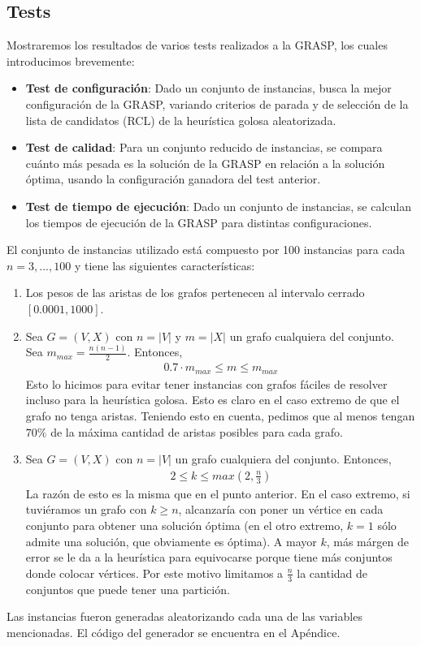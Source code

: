 \subsection{Tests}
Mostraremos los resultados de varios tests realizados a la GRASP, los cuales introducimos brevemente:
\begin{itemize}
    \item \textbf{Test de configuración}: Dado un conjunto de instancias, busca la mejor configuración de la GRASP, variando criterios de parada y de selección de la lista de candidatos (RCL) de la heurística golosa aleatorizada.
    \item \textbf{Test de calidad}: Para un conjunto reducido de instancias, se compara cuánto más pesada es la solución de la GRASP en relación a la solución óptima, usando la configuración ganadora del test anterior.
    \item \textbf{Test de tiempo de ejecución}: Dado un conjunto de instancias, se calculan los tiempos de ejecución de la GRASP para distintas configuraciones.
\end{itemize}

El conjunto de instancias utilizado está compuesto por 100 instancias para cada \\ ${n = 3, ..., 100}$ y tiene las siguientes características:
\begin{enumerate}
    \item Los pesos de las aristas de los grafos pertenecen al intervalo cerrado $[\num{0.0001}, \num{1000}]$.
    \item Sea $G = (V,X)$ con $n = |V|$ y $m = |X|$ un grafo cualquiera del conjunto.\\ Sea $m_{max} = \frac{n(n-1)}{2}$. Entonces,
            \begin{align*}
                \num{0.7} \cdot m_{max} \leq m \leq m_{max} 
            \end{align*}
            Esto lo hicimos para evitar tener instancias con grafos fáciles de resolver incluso para la heurística golosa. Esto es claro en el caso extremo de que el grafo no tenga aristas. Teniendo esto en cuenta, pedimos que al menos tengan $70\%$ de la máxima cantidad de aristas posibles para cada grafo.
    \item Sea $G = (V,X)$ con $n = |V|$ un grafo cualquiera del conjunto. Entonces,
            \begin{align*}
                        2 \leq k \leq max\left(2, \frac{n}{3}\right)
            \end{align*}
            La razón de esto es la misma que en el punto anterior. En el caso extremo, si tuviéramos un grafo con $k \geq n$, alcanzaría con poner un vértice en cada conjunto para obtener una solución óptima (en el otro extremo, $k = 1$ sólo admite una solución, que obviamente es óptima). A mayor $k$, más márgen de error se le da a la heurística para equivocarse porque tiene más conjuntos donde colocar vértices. Por este motivo limitamos a $\frac{n}{3}$ la cantidad de conjuntos que puede tener una partición.
\end{enumerate}
Las instancias fueron generadas aleatorizando cada una de las variables mencionadas. El código del generador se encuentra en el Apéndice.


